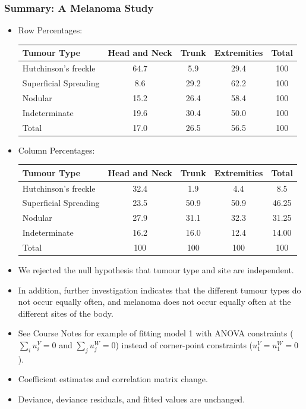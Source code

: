 \documentclass[oneside]{book}\usepackage[]{graphicx}\usepackage[svgnames]{xcolor}
\begin{document}
\subsubsection*{Summary: A Melanoma Study}
\begin{itemize}
    \item Row Percentages:
          \begin{table}[H]
              \centering
              \begin{tabular}{lcccc}
                  Tumour Type           & Head and Neck & Trunk & Extremities & Total \\
                  \midrule
                  Hutchinson's freckle  & 64.7          & 5.9   & 29.4        & 100   \\
                  Superficial Spreading & 8.6           & 29.2  & 62.2        & 100   \\
                  Nodular               & 15.2          & 26.4  & 58.4        & 100   \\
                  Indeterminate         & 19.6          & 30.4  & 50.0        & 100   \\
                  Total                 & 17.0          & 26.5  & 56.5        & 100
              \end{tabular}
          \end{table}
    \item Column Percentages:
          \begin{table}[H]
              \centering
              \begin{tabular}{lcccc}
                  Tumour Type           & Head and Neck & Trunk & Extremities & Total \\
                  \midrule
                  Hutchinson's freckle  & 32.4          & 1.9   & 4.4         & 8.5   \\
                  Superficial Spreading & 23.5          & 50.9  & 50.9        & 46.25 \\
                  Nodular               & 27.9          & 31.1  & 32.3        & 31.25 \\
                  Indeterminate         & 16.2          & 16.0  & 12.4        & 14.00 \\
                  Total                 & 100           & 100   & 100         & 100
              \end{tabular}
          \end{table}
    \item We rejected the null hypothesis that tumour type and site are independent.
    \item In addition, further investigation indicates that the different tumour types do not
          occur equally often, and melanoma does not occur equally often at the different
          sites of the body.
    \item See Course Notes for example of fitting model 1 with ANOVA constraints
          ($ \sum_i u_i^V=0 $ and $ \sum_j u_j^W =0$) instead of corner-point constraints ($ u_1^V=u_1^W=0 $).
    \item Coefficient estimates and correlation matrix change.
    \item Deviance, deviance residuals, and fitted values are unchanged.
\end{itemize}
\end{document}
